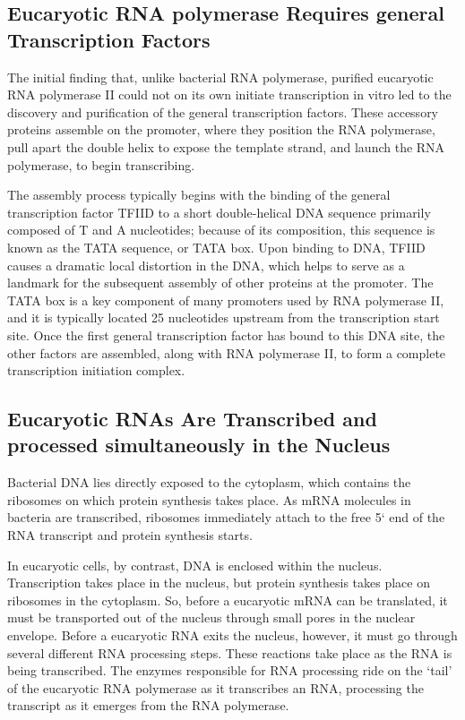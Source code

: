 \subsection{Eucaryotic RNA polymerase Requires general Transcription Factors}

The initial finding that, unlike bacterial RNA polymerase, purified eucaryotic
RNA polymerase II could not on its own initiate transcription in vitro
led to the discovery and purification of the general transcription factors.
These accessory proteins assemble on the promoter, where they position
the RNA polymerase, pull apart the double helix to expose the template
strand, and launch the RNA polymerase, to begin transcribing.

The assembly process typically
begins with the binding of the general transcription factor TFIID to a short
double-helical DNA sequence primarily composed of T and A nucleotides;
because of its composition, this sequence is known as the TATA sequence,
or TATA box. Upon binding to DNA, TFIID causes a dramatic local distortion in the DNA,
which helps to serve as a landmark for the
subsequent assembly of other proteins at the promoter. The TATA box is
a key component of many promoters used by RNA polymerase II, and it
is typically located 25 nucleotides upstream from the transcription start
site. Once the first general transcription factor has bound to this DNA site,
the other factors are assembled, along with RNA polymerase II, to form a
complete transcription initiation complex.


\subsection{Eucaryotic RNAs Are Transcribed and processed simultaneously in the Nucleus}

Bacterial DNA lies directly exposed to the cytoplasm,
which contains the ribosomes on which protein synthesis takes place.
As mRNA molecules in bacteria are transcribed, ribosomes immediately
attach to the free 5` end of the RNA transcript and protein synthesis
starts.

In eucaryotic cells, by contrast, DNA is enclosed within the nucleus.
Transcription takes place in the nucleus, but protein synthesis takes place
on ribosomes in the cytoplasm. So, before a eucaryotic mRNA can be
translated, it must be transported out of the nucleus through small pores
in the nuclear envelope. Before a eucaryotic RNA exits the
nucleus, however, it must go through several different RNA processing
steps. These reactions take place as the RNA is being transcribed. The
enzymes responsible for RNA processing ride on the ‘tail’ of the eucaryotic
RNA polymerase as it transcribes an RNA, processing the transcript as
it emerges from the RNA polymerase.

